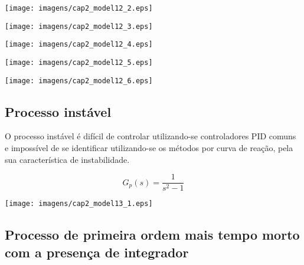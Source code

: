     \begin{center}
        \texttt{[image: imagens/cap2\_model12\_2.eps]}
    \end{center}
    
    \begin{center}
        \texttt{[image: imagens/cap2\_model12\_3.eps]}
    \end{center}
    
    \begin{center}
        \texttt{[image: imagens/cap2\_model12\_4.eps]}
    \end{center}
    
    \begin{center}
        \texttt{[image: imagens/cap2\_model12\_5.eps]}
    \end{center}
    
    \begin{center}
        \texttt{[image: imagens/cap2\_model12\_6.eps]}
    \end{center}

\subsection{Processo instável}
    
    O processo instável é difícil de controlar utilizando-se controladores \ac{PID}
    comuns e impossível de se identificar utilizando-se os métodos por curva de
    reação, pela sua característica de instabilidade.
    
    \begin{equation}
        G_p(s) = \frac{1}{s^2 - 1}
    \end{equation}
    
    \begin{center}
        \texttt{[image: imagens/cap2\_model13\_1.eps]}
    \end{center}

\subsection{Processo de primeira ordem mais tempo morto com a presença de integrador}
    
